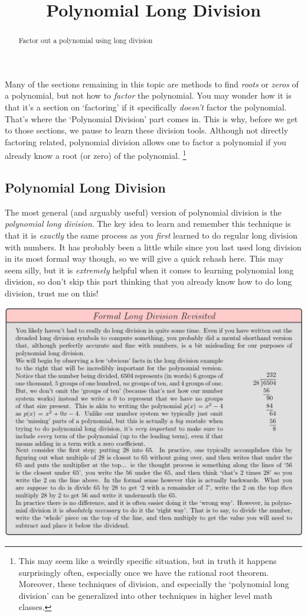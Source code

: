 \documentclass{ximeraXloud}
\title{Polynomial Long Division}
\begin{document}
\begin{abstract}
    Factor out a polynomial using long division
\end{abstract}
\maketitle

Many of the sections remaining in this topic are methods to find \textit{roots} or \textit{zeros} of a polynomial, but not how to \textit{factor} the polynomial. You may wonder how it is that it's a section on `factoring' if it specifically \textit{doesn't} factor the polynomial. That's where the `Polynomial Division' part comes in. This is why, before we get to those sections, we pause to learn these division tools. Although not directly factoring related, polynomial division allows one to factor a polynomial if you already know a root (or zero) of the polynomial.%
\footnote{%
    This may seem like a weirdly specific situation, but in truth it happens surprisingly often, especially once we have the rational root theorem. Moreover, these techniques of division, and especially the `polynomial long division' can be generalized into other techniques in higher level math classes.%
    }%

\subsection{Polynomial Long Division}
    The most general (and arguably useful) version of polynomial division is the \textit{polynomial long division}. The key idea to learn and remember this technique is that it is \textit{exactly} the same process as you \textit{first} learned to do regular long division with numbers. It has probably been a little while since you last used long division in its most formal way though, so we will give a quick rehash here. This may seem silly, but it is \textit{extremely} helpful when it comes to learning polynomial long division, so don't skip this part thinking that you already know how to do long division, trust me on this!
    
    \begin{image}
        \includegraphics[width=\textwidth]{formalLongDivisionRevisited.png}
    \end{image}%
    
\end{document}
